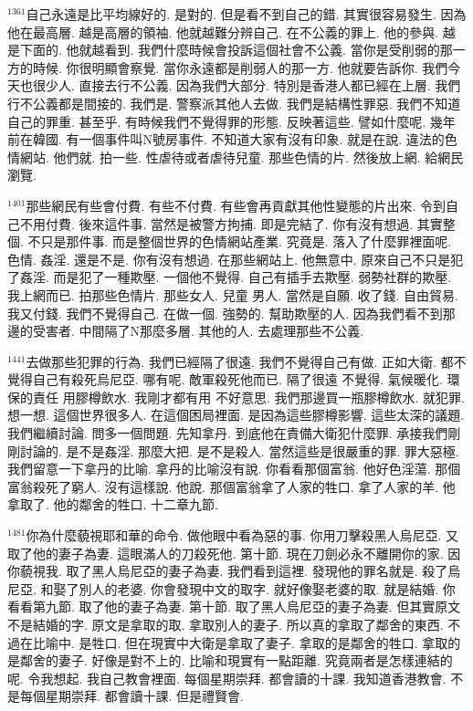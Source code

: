 \documentclass{book}
\begin{document}
$^{1361}$自己永遠是比平均線好的.
是對的.
但是看不到自己的錯.
其實很容易發生.
因為他在最高層.
越是高層的領袖.
他就越難分辨自己.
在不公義的罪上.
他的參與.
越是下面的.
他就越看到.
我們什麼時候會投訴這個社會不公義.
當你是受削弱的那一方的時候.
你很明顯會察覺.
當你永遠都是削弱人的那一方.
他就要告訴你.
我們今天也很少人.
直接去行不公義.
因為我們大部分.
特別是香港人都已經在上層.
我們行不公義都是間接的.
我們是.
警察派其他人去做.
我們是結構性罪惡.
我們不知道自己的罪重.
甚至乎.
有時候我們不覺得罪的形態.
反映著這些.
譬如什麼呢.
幾年前在韓國.
有一個事件叫N號房事件.
不知道大家有沒有印象.
就是在說.
違法的色情網站.
他們就.
拍一些.
性虐待或者虐待兒童.
那些色情的片.
然後放上網.
給網民瀏覽.

$^{1401}$那些網民有些會付費.
有些不付費.
有些會再貢獻其他性變態的片出來.
令到自己不用付費.
後來這件事.
當然是被警方拘捕.
即是完結了.
你有沒有想過.
其實整個.
不只是那件事.
而是整個世界的色情網站產業.
究竟是.
落入了什麼罪裡面呢.
色情.
姦淫.
還是不是.
你有沒有想過.
在那些網站上.
他無意中.
原來自己不只是犯了姦淫.
而是犯了一種欺壓.
一個他不覺得.
自己有插手去欺壓.
弱勢社群的欺壓.
我上網而已.
拍那些色情片.
那些女人.
兒童 男人.
當然是自願.
收了錢.
自由貿易.
我又付錢.
我們不覺得自己.
在做一個.
強勢的.
幫助欺壓的人.
因為我們看不到那邊的受害者.
中間隔了N那麼多層.
其他的人.
去處理那些不公義.

$^{1441}$去做那些犯罪的行為.
我們已經隔了很遠.
我們不覺得自己有做.
正如大衛.
都不覺得自己有殺死烏尼亞.
哪有呢.
敵軍殺死他而已.
隔了很遠 不覺得.
氣候暖化.
環保的責任 用膠樽飲水.
我剛才都有用 不好意思.
我們那邊買一瓶膠樽飲水.
就犯罪.
想一想.
這個世界很多人.
在這個困局裡面.
是因為這些膠樽影響.
這些太深的議題.
我們繼續討論.
問多一個問題.
先知拿丹.
到底他在責備大衛犯什麼罪.
承接我們剛剛討論的.
是不是姦淫.
那麼大把.
是不是殺人.
當然這些是很嚴重的罪.
罪大惡極.
我們留意一下拿丹的比喻.
拿丹的比喻沒有說.
你看看那個富翁.
他好色淫蕩.
那個富翁殺死了窮人.
沒有這樣說.
他說.
那個富翁拿了人家的牲口.
拿了人家的羊.
他拿取了.
他的鄰舍的牲口.
十二章九節.

$^{1481}$你為什麼藐視耶和華的命令.
做他眼中看為惡的事.
你用刀擊殺黑人烏尼亞.
又取了他的妻子為妻.
這眼滿人的刀殺死他.
第十節.
現在刀劍必永不離開你的家.
因你藐視我.
取了黑人烏尼亞的妻子為妻.
我們看到這裡.
發現他的罪名就是.
殺了烏尼亞.
和娶了別人的老婆.
你會發現中文的取字.
就好像娶老婆的取.
就是結婚.
你看看第九節.
取了他的妻子為妻.
第十節.
取了黑人烏尼亞的妻子為妻.
但其實原文不是結婚的字.
原文是拿取的取.
拿取別人的妻子.
所以真的拿取了鄰舍的東西.
不過在比喻中.
是牲口.
但在現實中大衛是拿取了妻子.
拿取的是鄰舍的牲口.
拿取的是鄰舍的妻子.
好像是對不上的.
比喻和現實有一點距離.
究竟兩者是怎樣連結的呢.
令我想起.
我自己教會裡面.
每個星期崇拜.
都會讀的十課.
我知道香港教會.
不是每個星期崇拜.
都會讀十課.
但是禮賢會.
\end{document}
